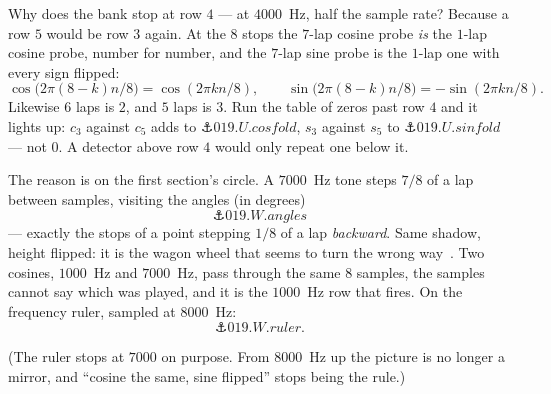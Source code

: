 \begin{narrative}
Why does the bank stop at row $4$ — at $4000$~Hz, half the sample rate?
Because a row $5$ would be row $3$ again. At the $8$ stops the $7$-lap
cosine probe \emph{is} the $1$-lap cosine probe, number for number, and
the $7$-lap sine probe is the $1$-lap one with every sign flipped:
\[
  \cos\bigl(2\pi (8 - k) n/8\bigr) = \cos(2\pi k n/8), \qquad
  \sin\bigl(2\pi (8 - k) n/8\bigr) = -\sin(2\pi k n/8) .
\]
Likewise $6$ laps is $2$, and $5$ laps is $3$. Run the table of zeros
past row $4$ and it lights up: $c_3$ against $c_5$ adds to
$\anchor{019.U.cosfold}$, $s_3$ against $s_5$ to
$\anchor{019.U.sinfold}$ — not $0$. A detector above row $4$ would only
repeat one below it.

The reason is on the first section's circle. A $7000$~Hz tone steps
$7/8$ of a lap between samples, visiting the angles (in degrees)
\[
  \anchor{019.W.angles}
\]
— exactly the stops of a point stepping $1/8$ of a lap \emph{backward}. Same shadow, height flipped: it is the
wagon wheel that seems to turn the wrong
way~\cite{signal_processing-wikipedia-aliasing}. Two cosines, $1000$~Hz
and $7000$~Hz, pass through the same $8$ samples, the samples cannot
say which was played, and it is the $1000$~Hz row that fires. On the
frequency ruler, sampled at $8000$~Hz:
\[
  \anchor{019.W.ruler} .
\]

\begin{center}
\end{center}

\noindent (The ruler stops at $7000$ on purpose. From $8000$~Hz up the
picture is no longer a mirror, and ``cosine the same, sine flipped''
stops being the rule.)


\end{narrative}

